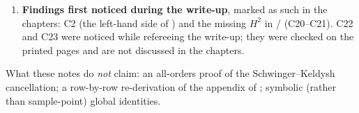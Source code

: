 \begin{enumerate}[leftmargin=18pt,itemsep=2pt]
and~9 later revised Task~6's relative-sign conclusion; this is a revision between reports, not an error inside one. The Task~12 remark that
$\square y^{1-D/2}$ vanishes pointwise is inexact: $\square y^{1-D/2}=\tfrac{D(D-2)}{4}H^2y^{1-D/2}$; the conclusion is unaffected. The Task~13 and
Task~15 overstatements are items 2 and 4 above. In Task~18, $\kappa^2$ was written twice, and the notation $C$ versus $\tilde C$ is made explicit here
($\tilde C\equiv16\pi^2C/H^2$; see E2); the quadrature agreement was quoted as $10^{-20}$, $\lesssim10^{-19}$ and $\le1.2\times10^{-19}$ in
different places, while the logged maximum is $1.02\times10^{-19}$.
\item \textbf{Findings first noticed during the write-up}, marked as such in the chapters: C2 (the left-hand side of ) and the missing $H^2$ in
/ (C20--C21). C22 and C23 were noticed while refereeing the write-up; they were checked on the printed pages and are not discussed in
the chapters.
\end{enumerate}
\noindent What these notes do \emph{not} claim: an all-orders proof of the Schwinger--Keldysh cancellation; a row-by-row re-derivation of the
appendix of \PI; symbolic (rather than sample-point) global identities.
